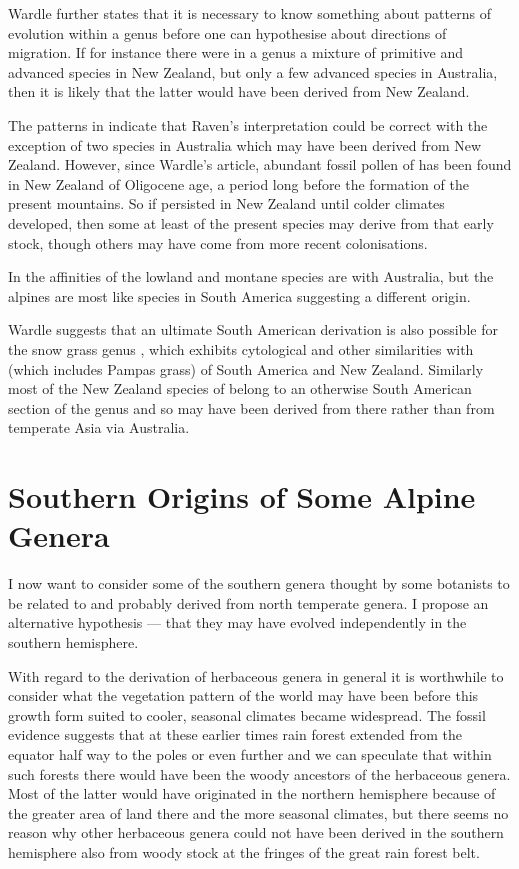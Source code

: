 Wardle further states that it is necessary to know something about patterns of evolution within a genus before one can hypothesise about directions of migration.
If for instance there were in a genus a mixture of primitive and advanced species in New Zealand, but only a few advanced species in Australia, then it is likely that the latter would have been derived from New Zealand.

The patterns in  indicate that Raven's interpretation could be correct with the exception of two species in Australia which may have been derived from New Zealand.
However, since Wardle's article, abundant fossil pollen of  has been found in New Zealand of Oligocene age, a period long before the formation of the present mountains.
So if  persisted in New Zealand until colder climates developed, then some at least of the present species may derive from that early stock, though others may have come from more recent colonisations.

In  the affinities of the lowland and montane species are with Australia, but the alpines are most like species in South America suggesting a different origin.

Wardle suggests that an ultimate South American derivation is also possible for the snow grass genus , which exhibits cytological and other similarities with  (which includes Pampas grass) of South America and New Zealand.
Similarly most of the New Zealand species of  belong to an otherwise South American section of the genus and so may have been derived from there rather than from temperate Asia via Australia.

\section{Southern Origins of Some Alpine Genera}

I now want to consider some of the southern genera thought by some botanists to be related to and probably derived from north temperate genera.
I propose an alternative hypothesis — that they may have evolved independently in the southern hemisphere.

With regard to the derivation of herbaceous genera in general it is worthwhile to consider what the vegetation pattern of the world may have been before this growth form suited to cooler, seasonal climates became widespread.
The fossil evidence suggests that at these earlier times rain forest extended from the equator half way to the poles or even further and we can speculate that within such forests there would have been the woody ancestors of the herbaceous genera.
Most of the latter would have originated in the northern hemisphere because of the greater area of land there and the more seasonal climates, but there seems no reason why other herbaceous genera could not have been derived in the southern hemisphere also from woody stock at the fringes of the great rain forest belt.

